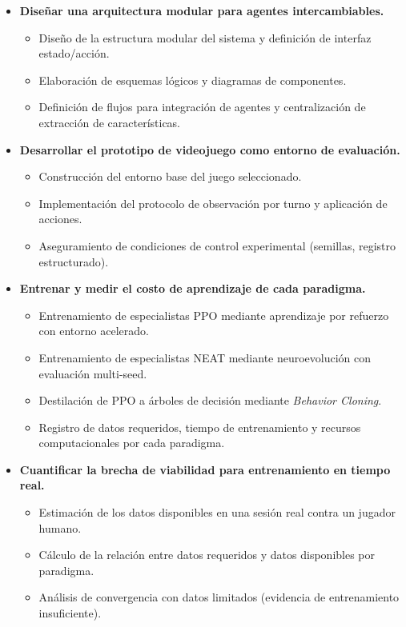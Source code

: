 \begin{itemize}

    \item \textbf{Diseñar una arquitectura modular para agentes intercambiables.}
    \begin{itemize}
        \item Diseño de la estructura modular del sistema y definición de interfaz estado/acción.
        \item Elaboración de esquemas lógicos y diagramas de componentes.
        \item Definición de flujos para integración de agentes y centralización de extracción de características.
    \end{itemize}

    \item \textbf{Desarrollar el prototipo de videojuego como entorno de evaluación.}
    \begin{itemize}
        \item Construcción del entorno base del juego seleccionado.
        \item Implementación del protocolo de observación por turno y aplicación de acciones.
        \item Aseguramiento de condiciones de control experimental (semillas, registro estructurado).
    \end{itemize}

    \item \textbf{Entrenar y medir el costo de aprendizaje de cada paradigma.}
    \begin{itemize}
        \item Entrenamiento de especialistas PPO mediante aprendizaje por refuerzo con entorno acelerado.
        \item Entrenamiento de especialistas NEAT mediante neuroevolución con evaluación multi-seed.
        \item Destilación de PPO a árboles de decisión mediante \textit{Behavior Cloning}.
        \item Registro de datos requeridos, tiempo de entrenamiento y recursos computacionales por cada paradigma.
    \end{itemize}

    \item \textbf{Cuantificar la brecha de viabilidad para entrenamiento en tiempo real.}
    \begin{itemize}
        \item Estimación de los datos disponibles en una sesión real contra un jugador humano.
        \item Cálculo de la relación entre datos requeridos y datos disponibles por paradigma.
        \item Análisis de convergencia con datos limitados (evidencia de entrenamiento insuficiente).
    \end{itemize}


\end{itemize}
